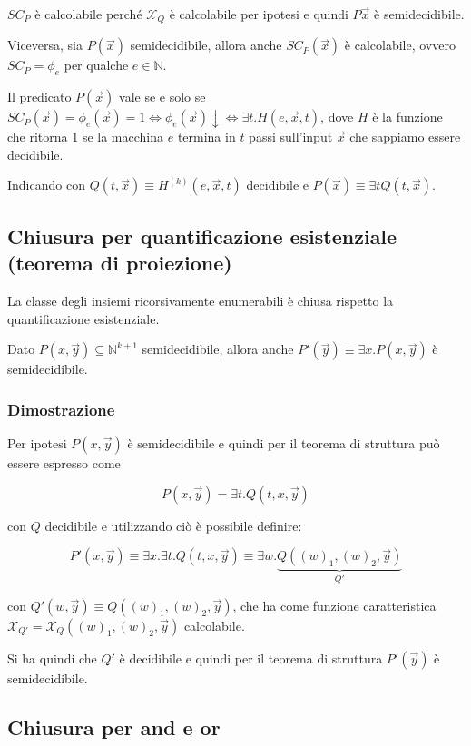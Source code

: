 $SC_P$ è calcolabile perché $\mathcal{X}_Q$ è calcolabile per ipotesi e quindi $P\vec{x}$ è semidecidibile.

Viceversa, sia $P(\vec{x})$ semidecidibile, allora anche $SC_P(\vec{x})$ è calcolabile, ovvero $SC_P = \phi_e$ per qualche $e \in \mathbb{N}$.

Il predicato $P(\vec{x})$ vale se e solo se $SC_P(\vec{x}) = \phi_e(\vec{x}) = 1 \Leftrightarrow \phi_e(\vec{x})\downarrow \Leftrightarrow \exists t . H(e, \vec{x}, t)$, dove $H$ è la funzione che ritorna 1 se la macchina $e$ termina in $t$ passi sull'input $\vec{x}$ che sappiamo essere decidibile.

Indicando con $Q(t,\vec{x}) \equiv H^{(k)}(e, \vec{x},t)$ decidibile e $P(\vec{x}) \equiv \exists t Q(t,\vec{x})$.

\subsection{Chiusura per quantificazione esistenziale (teorema di proiezione)}

La classe degli insiemi ricorsivamente enumerabili è chiusa rispetto la quantificazione esistenziale.

Dato $P(x,\vec{y}) \subseteq \mathbb{N}^{k+1}$ semidecidibile, allora anche $P'(\vec{y}) \equiv \exists x. P(x,\vec{y})$ è semidecidibile.

\subsubsection{Dimostrazione}

Per ipotesi $P(x,\vec{y})$ è semidecidibile e quindi per il teorema di struttura può essere espresso come

$$
P(x,\vec{y}) = \exists t . Q(t,x, \vec{y})
$$

 con $Q$ decidibile e utilizzando ciò è possibile definire:
 
 $$
 P'(x,\vec{y}) \equiv \exists x.\exists t . Q(t,x, \vec{y}) \equiv \exists w . \underbrace{Q((w)_1, (w)_2, \vec{y})}_{Q'}
 $$
 
 con $Q'(w,\vec{y}) \equiv Q((w)_1, (w)_2, \vec{y})$, che ha come funzione caratteristica $\mathcal{X}_{Q'} = \mathcal{X}_Q((w)_1, (w)_2, \vec{y})$ calcolabile.
 
 Si ha quindi che $Q'$ è decidibile e quindi per il teorema di struttura $P'(\vec{y})$ è semidecidibile.
 
 \subsection{Chiusura per and e or}
 
